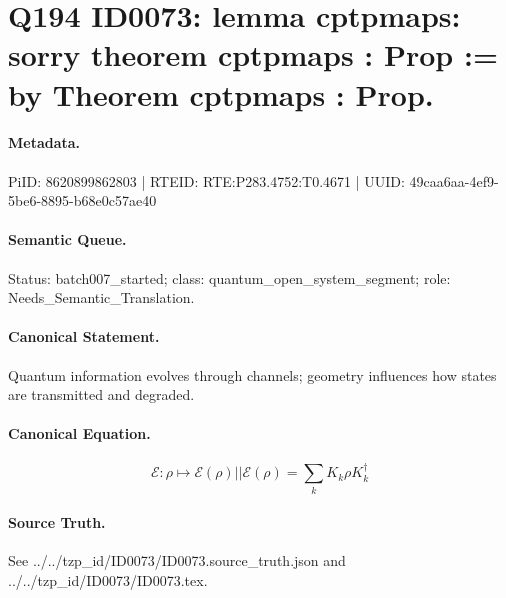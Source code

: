 \section*{Q194 ID0073: lemma cptpmaps: sorry theorem cptpmaps : Prop := by Theorem cptpmaps : Prop.}
\paragraph{Metadata.}
PiID: 8620899862803 | RTEID: RTE:P283.4752:T0.4671 | UUID: 49caa6aa-4ef9-5be6-8895-b68e0c57ae40

\paragraph{Semantic Queue.}
Status: batch007\_started; class: quantum\_open\_system\_segment; role: Needs\_Semantic\_Translation.

\paragraph{Canonical Statement.}
Quantum information evolves through channels; geometry influences how states are transmitted and degraded.

\paragraph{Canonical Equation.}
\[
\mathcal{E}:\rho \mapsto \mathcal{E}(\rho) || \mathcal{E}(\rho) = \sum_{k} K_{k}\rho K_{k}^{\dagger}
\]

\paragraph{Source Truth.}
See ../../tzp\_id/ID0073/ID0073.source\_truth.json and ../../tzp\_id/ID0073/ID0073.tex.
